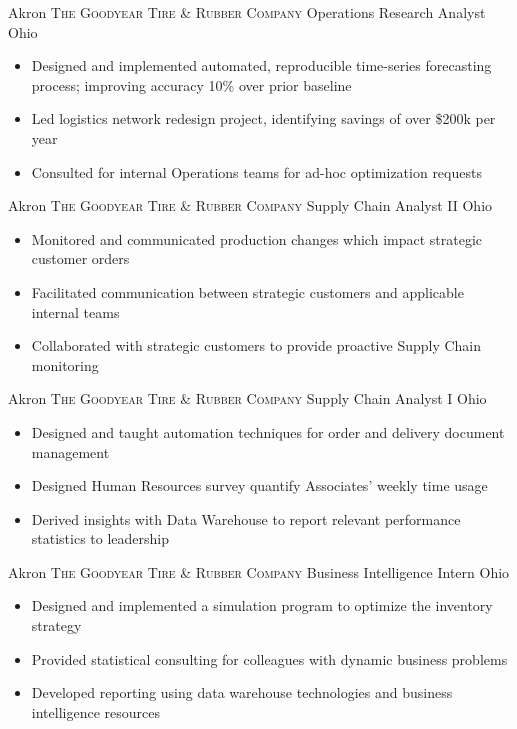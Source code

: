 \documentclass[letterpaper,12pt,color,final]{moderncv}
\begin{document}
{Akron}
{\textsc{The Goodyear Tire \& Rubber Company}}
{Operations Research Analyst}
{Ohio}
{\begin{itemize}
  \item Designed and implemented automated, reproducible time-series forecasting process; improving accuracy 10\% over prior baseline
  \item Led logistics network redesign project, identifying savings of over \$200k per year
  \item Consulted for internal Operations teams for ad-hoc optimization requests
 \end{itemize}}


{Akron}
{\textsc{The Goodyear Tire \& Rubber Company}}
{Supply Chain Analyst II}
{Ohio}
{\begin{itemize}
  \item Monitored and communicated production changes which impact strategic customer orders
  \item Facilitated communication between strategic customers and applicable internal teams
  \item Collaborated with strategic customers to provide proactive Supply Chain monitoring
 \end{itemize}}

{Akron}
{\textsc{The Goodyear Tire \& Rubber Company}}
{Supply Chain Analyst I}
{Ohio}
{\begin{itemize}
  \item Designed and taught automation techniques for order and delivery document management
  \item Designed Human Resources survey quantify Associates' weekly time usage
  \item Derived insights with Data Warehouse to report relevant performance statistics to leadership
 \end{itemize}}

{Akron}
{\textsc{The Goodyear Tire \& Rubber Company}}
{Business Intelligence Intern}
{Ohio}
{\begin{itemize}
  \item Designed and implemented a simulation program to optimize the inventory strategy
  \item Provided statistical consulting for colleagues with dynamic business problems
  \item Developed reporting using data warehouse technologies and business intelligence resources
 \end{itemize}}
\end{document}
